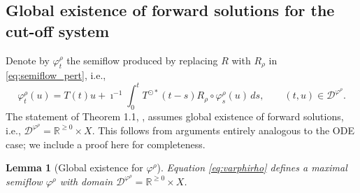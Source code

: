 \documentclass[a4paper, 12pt, oneside, reqno, notitlepage]{amsart}
\theoremstyle{plain}
\newtheorem{lemma}[theorem]{Lemma}
\theoremstyle{definition}
\theoremstyle{remark}
\begin{document}
\subsection{Global existence of forward solutions for the cut-off system}

Denote by $\varphi_t^\rho$ the semiflow produced by replacing $R$ with $R_\rho$ in \eqref{eq:semiflow_pert}, i.e.,
\begin{equation}
    \varphi_t^\rho(u) = T(t) u + \imath^{-1} \int_0^t T^{\odot *} (t-s) R_\rho \circ \varphi_s^\rho(u) \, ds,  \qquad (t,u) \in \mathcal{D}^{\varphi^\rho}.
    \label{eq:varphirho}
\end{equation}
The statement of Theorem 1.1, \cite{chen1997invariant}, assumes global existence of forward solutions, i.e., $\mathcal{D}^{\varphi^\rho} = \mathbb{R}^{\geq 0} \times X$.
This follows from arguments entirely analogous to the ODE case; we include a proof here for completeness.





\begin{lemma}[Global existence for $\varphi^\rho$] \label{lemma:globalexist}
    Equation \eqref{eq:varphirho} defines a maximal semiflow $\varphi^\rho$ with domain $\mathcal{D}^{\varphi^\rho} = \mathbb{R}^{\geq 0} \times X$.
\end{lemma}
\end{document}
